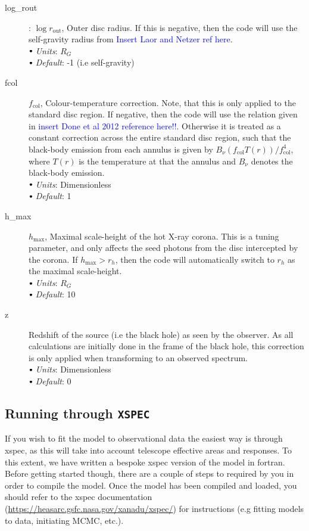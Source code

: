 \documentclass[a4paper, 11pt, times, onecolumn]{article}
\newcommand{\rout}{r_{\mathrm{out}}}
\newcommand{\fcol}{f_{\mathrm{col}}}
\newcommand{\hmax}{h_{\mathrm{max}}}
\newcommand{\sbt}{\,\begin{picture}(-1,1)(-1,-3)\circle*{3}\end{picture}\ }
\begin{document}
\begin{description}
	\item[log\_rout]: $\log \rout$, Outer disc radius. If this is negative, then the code will use the self-gravity radius from \textcolor{blue}{Insert Laor and Netzer ref here}. \\
		$\sbt$ {\it Units}: $R_{G}$ \\
		$\sbt$ {\it Default}: -1 (i.e self-gravity)
	
	\item[fcol] $\fcol$, Colour-temperature correction. Note, that this is only applied to the standard disc region. If negative, then the code will use the relation given in \textcolor{blue}{insert Done et al 2012 reference here!!}. Otherwise it is treated as a constant correction across the entire standard disc region, such that the black-body emission from each annulus is given by $B_{\nu}(\fcol T(r))/\fcol^{4}$, where $T(r)$ is the temperature at that the annulus and $B_{\nu}$ denotes the black-body emission.\\
		$\sbt$ {\it Units}: Dimensionless \\
		$\sbt$ {\it Default}: 1 
	
	\item[h\_max] $\hmax$, Maximal scale-height of the hot X-ray corona. This is a tuning parameter, and only affects the seed photons from the disc intercepted by the corona. If $\hmax > r_{h}$, then the code will automatically switch to $r_{h}$ as the maximal scale-height. \\
		$\sbt$ {\it Units}: $R_{G}$ \\
		$\sbt$ {\it Default}: 10
	
	\item[z] Redshift of the source (i.e the black hole) as seen by the observer. As all calculations are initially done in the frame of the black hole, this correction is only applied when transforming to an observed spectrum. \\
		$\sbt$ {\it Units}: Dimensionless \\
		$\sbt$ {\it Default}: 0
		
\end{description}




\subsection{Running through {\tt XSPEC}}

If you wish to fit the model to observational data the easiest way is through {\sc xspec}, as this will take into account telescope effective areas and responses. To this extent, we have written a bespoke {\sc xspec} version of the model in {\sc fortran}. Before getting started though, there are a couple of steps to required by you in order to compile the model. Once the model has been compiled and loaded, you should refer to the {\sc xspec} documentation (\url{https://heasarc.gsfc.nasa.gov/xanadu/xspec/}) for instructions (e.g fitting models to data, initiating MCMC, etc.).
\end{document}
